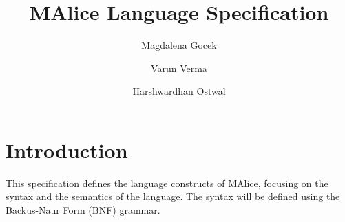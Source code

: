 \documentclass[a4wide, 11pt]{article}
\begin{document}
\title{MAlice Language Specification}

\author{Magdalena Gocek \and Varun Verma \and Harshwardhan Ostwal}

\maketitle            %

\section{Introduction}
\label{sec:intro}
This specification defines the language constructs of MAlice, focusing on  
the syntax and the semantics of the language. The syntax will be defined
using the Backus-Naur Form (BNF) grammar.


\end{document}
